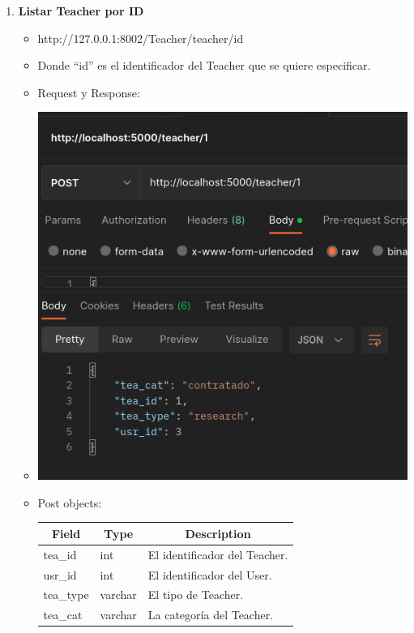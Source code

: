 \documentclass{article}
\begin{document}
\begin{enumerate}
    \item \textbf{Listar Teacher por ID}
    \begin{itemize}
        \item http://127.0.0.1:8002/Teacher/teacher/id
        \item Donde ``id'' es el identificador del Teacher que se quiere
        especificar.
        \item Request y Response:
        \item \includegraphics[scale=.5]{assets/teacher/teacher1.png}
        \item Post objects: \begin{table}[H] \centering \begin{tabular}{|l|l|l|}
        \hline \multicolumn{1}{|c|}{\textbf{Field}} &
        \multicolumn{1}{c|}{\textbf{Type}} &
        \multicolumn{1}{c|}{\textbf{Description}} \\ \hline tea\_id & int & El
        identificador del Teacher. \\ \hline usr\_id & int & El identificador
        del User. \\ \hline tea\_type & varchar & El tipo de Teacher. \\ \hline
        tea\_cat & varchar & La categoría del Teacher. \\ \hline \end{tabular}
        \end{table}
        

\end{itemize}
\end{enumerate}
\end{document}
